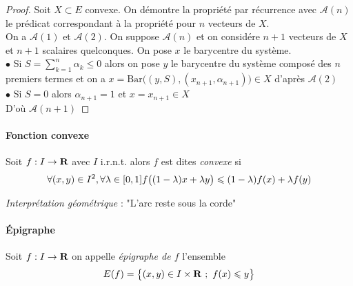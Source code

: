	 \medskip
	
    
    \begin{proof}
    Soit $X\subset E$ convexe. On démontre la propriété par récurrence avec $\mathcal{A}(n)$ le prédicat correspondant à la propriété pour $n$ vecteurs de $X$. \\
    On a $\mathcal{A}(1)$ et $\mathcal{A}(2)$. On suppose $\mathcal{A}(n)$ et on considére $n+1$ vecteurs de $X$ et $n+1$ scalaires quelconques. On pose $x$ le barycentre du système. \\
    $\bullet $ Si $S = \sum_{k=1}^n \alpha_k \leqslant 0$ alors on pose $y$ le barycentre du système composé des $n$ premiers termes et on a $x= \mathrm{Bar} \big( (y,S),(x_{n+1},\alpha_{n+1}) \big) \in X$ d'après $\mathcal{A}(2)$ \\
    $\bullet $ Si $S=0$ alors $\alpha_{n+1} = 1$ et $x=x_{n+1} \in X$ \\
    D'où $\mathcal{A}(n+1)$
    \end{proof}
    
    \traitd
    \paragraph{Fonction convexe}
        Soit $f:I\rightarrow {\mathbf{R}}$ avec $I$ i.r.n.t. alors $f$ est dites \emph{convexe} si 
		\[
        		\forall (x,y) \in I^2, \forall \lambda\in [0,1] \\ f\big( (1-\lambda )x + \lambda y \big) \leqslant (1-\lambda )f(x) + \lambda f(y)
        	\vspace{-25pt}
        \] 
    \trait 
    
    {\emph{Interprétation géométrique} : "L'arc reste sous la corde"} 
    
    \traitd
    \paragraph{Épigraphe}
        Soit $f:I\rightarrow {\mathbf{R}}$ on appelle \emph{épigraphe de $f$} l'ensemble 
        \[
        		E(f)=\big\{(x,y)\in I\times\R ~;~f(x)\leqslant y\big\}
        	\vspace{-25pt}
        	\]
    \trait
    
    
